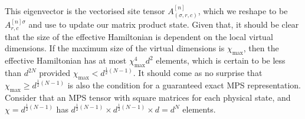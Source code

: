 This eigenvector is the vectorised site tensor \(A^{[n]}_{(\sigma, r, c)}\), which we reshape to be \(A^{[n] \sigma}_{r,c}\) and use to update our matrix product state. Given that, it should be clear that the size of the effective Hamiltonian is dependent on the local virtual dimensions. If the maximum size of the virtual dimensions is \(\chi_{\mathrm{max}}\), then the effective Hamiltonian has at most \(\chi_{\mathrm{max}}^{4}d^{2}\) elements, which is certain to be less than \(d^{2N}\) provided \(\chi_{\mathrm{max}} < d^{\frac{1}{2}(N-1)}\). It should come as no surprise that \(\chi_{\mathrm{max}} \geq d^{\frac{1}{2}(N-1)}\) is also the condition for a guaranteed exact MPS representation. Consider that an MPS tensor with square matrices for each physical state, and \(\chi = d^{\frac{1}{2}(N-1)}\) has \(d^{\frac{1}{2}(N-1)} \times d^{\frac{1}{2}(N-1)} \times d = d^{N}\) elements.

